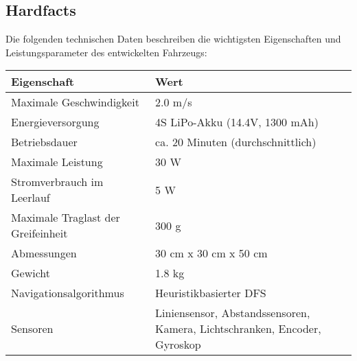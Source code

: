 \documentclass[main.tex]{subfiles} %
\begin{document}

\subsection{Hardfacts}

Die folgenden technischen Daten beschreiben die wichtigsten Eigenschaften und
Leistungsparameter des entwickelten Fahrzeugs:

\begin{table}[h!]
    \centering
    \renewcommand{\arraystretch}{1.5}
    \begin{tabular}{|l|p{7cm}|}
        \hline
        \textbf{Eigenschaft}               & \textbf{Wert}                                                             \\ \hline
        Maximale Geschwindigkeit           & 2.0 m/s                                                                   \\ \hline
        Energieversorgung                  & 4S LiPo-Akku (14.4V, 1300 mAh)                                            \\ \hline
        Betriebsdauer                      & ca. 20 Minuten (durchschnittlich)                                         \\ \hline
        Maximale Leistung                  & 30 W                                                                      \\ \hline %
        Stromverbrauch im Leerlauf         & 5 W                                                                       \\ \hline %
        Maximale Traglast der Greifeinheit & 300 g                                                                     \\ \hline %
        Abmessungen                        & 30 cm x 30 cm x 50 cm                                                     \\ \hline
        Gewicht                            & 1.8 kg                                                                    \\ \hline
        Navigationsalgorithmus             & Heuristikbasierter DFS                                                    \\ \hline
        Sensoren                           & Liniensensor, Abstandssensoren, Kamera, Lichtschranken, Encoder, Gyroskop \\ \hline

\end{tabular}
\end{table}
\end{document}
